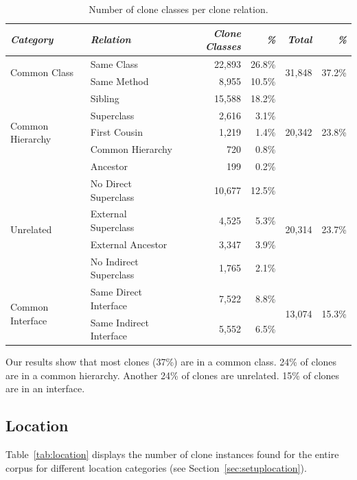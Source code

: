 \documentclass[runningheads]{llncs}
\begin{document}
\begin{table}[H]
\centering
\caption{Number of clone classes per clone relation.}
\begin{tabular}{@{}l|l|rr|rr@{}}
\toprule
\textit{\textbf{Category}} & \textit{\textbf{Relation}} & \textit{\textbf{Clone Classes}} & \textit{\textbf{\%}} & \textit{\textbf{Total}} & \textit{\textbf{\%}} \\ \midrule
\multirow{2}{*}{Common Class} & Same Class & 22,893 & 26.8\% & \multirow{2}{*}{31,848} & \multirow{2}{*}{37.2\%} \\ \cmidrule(lr){2-4}
 & Same Method & 8,955 & 10.5\% & & \\ \midrule
\multirow{5}{*}{Common Hierarchy} & Sibling & 15,588 & 18.2\% & \multirow{5}{*}{20,342}& \multirow{5}{*}{23.8\%} \\ \cmidrule(lr){2-4}
 & Superclass & 2,616 & 3.1\% & & \\ \cmidrule(lr){2-4}
 & First Cousin & 1,219 & 1.4\% & & \\ \cmidrule(lr){2-4}
 & Common Hierarchy & 720 & 0.8\% & & \\ \cmidrule(lr){2-4}
 & Ancestor & 199 & 0.2\% & & \\ \midrule
\multirow{4}{*}{Unrelated} & No Direct Superclass & 10,677 & 12.5\% & \multirow{4}{*}{20,314}& \multirow{4}{*}{23.7\%} \\ \cmidrule(lr){2-4}
 & External Superclass & 4,525 & 5.3\% & & \\ \cmidrule(lr){2-4}
 & External Ancestor & 3,347 & 3.9\% & & \\ \cmidrule(lr){2-4}
 & No Indirect Superclass & 1,765 & 2.1\% & & \\ \midrule
\multirow{2}{*}{Common Interface} & Same Direct Interface & 7,522 & 8.8\% & \multirow{2}{*}{13,074} & \multirow{2}{*}{15.3\%} \\ \cmidrule(lr){2-4}
 & Same Indirect Interface & 5,552 & 6.5\% & & \\ \bottomrule
\end{tabular}
\label{tab:relation}
\end{table}

Our results show that most clones (37\%) are in a common class. 24\% of clones are in a common hierarchy. Another 24\% of clones are unrelated. 15\% of clones are in an interface.

\subsection{Location}
Table~\ref{tab:location} displays the number of clone instances found for the entire corpus for different location categories (see Section~\ref{sec:setuplocation}).
\end{document}
